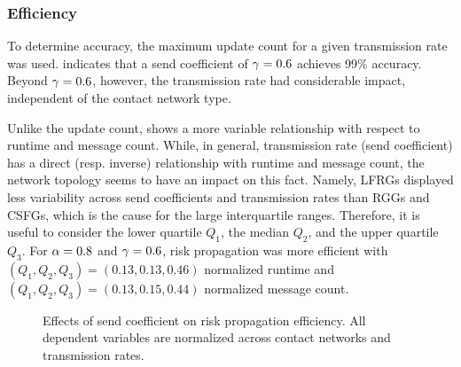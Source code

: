 \subsubsection{Efficiency}

To determine accuracy, the maximum update count for a given transmission rate was used.  indicates that a send coefficient of $\gamma = 0.6$ achieves 99\% accuracy. Beyond $\gamma = 0.6$, however, the transmission rate had considerable impact, independent of the contact network type.

Unlike the update count,  shows a more variable relationship with respect to runtime and message count. While, in general, transmission rate (send coefficient) has a direct (resp. inverse) relationship with runtime and message count, the network topology seems to have an impact on this fact. Namely, LFRGs displayed less variability across send coefficients and transmission rates than RGGs and CSFGs, which is the cause for the large interquartile ranges. Therefore, it is useful to consider the lower quartile $Q_1$, the median $Q_2$, and the upper quartile $Q_3$. For $\alpha = 0.8 $ and $\gamma = 0.6$, risk propagation was more efficient with $(Q_{1}, Q_{2}, Q_{3}) = (0.13, 0.13, 0.46)$ normalized runtime and $(Q_{1}, Q_{2}, Q_{3}) = (0.13, 0.15, 0.44)$ normalized message count.

\begin{figure}[htbp]
\centering
{}
\caption[Effects of send coefficient on risk propagation efficiency]{Effects of send coefficient on risk propagation efficiency. All dependent variables are normalized across contact networks and transmission rates.}
\label{fig:efficiency}
\end{figure}

